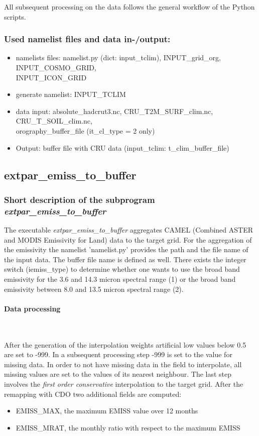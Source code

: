 \documentclass[a4paper,10pt,DIV14,BCOR1cm,titlepage,twoside]{scrartcl}
\begin{document}
\noindent All subsequent processing on the data follows the general workflow of the Python scripts.

\subsubsection{Used namelist files and data in-/output:}
\begin{itemize}
 \item namelists files: namelist.py (dict: input\_tclim), INPUT\_grid\_org, INPUT\_COSMO\_GRID, \\
       INPUT\_ICON\_GRID
 \item generate namelist: INPUT\_TCLIM
 \item data input: absolute\_hadcrut3.nc, CRU\_T2M\_SURF\_clim.nc, CRU\_T\_SOIL\_clim.nc, \\
       orography\_buffer\_file (it\_cl\_type = 2 only)
 \item Output: buffer file with CRU data (input\_tclim: t\_clim\_buffer\_file)
\end{itemize}

\subsection{extpar\_emiss\_to\_buffer}\label{extpar_emiss_to_buffer}
\subsubsection{Short description of the subprogram \textit{extpar\_emiss\_to\_buffer}}
The executable \textit{extpar\_emiss\_to\_buffer} aggregates CAMEL (Combined ASTER and MODIS Emissivity for Land) data  to the target grid.
For the aggregation of the emissivity the namelist 'namelist.py' provides the path and the file name of the input data. The buffer file name is defined as well. There exists the integer switch (iemiss\_type)
to determine whether one wants to use the broad band emissivity for the 3.6 and 14.3 micron spectral range
(1) or the broad band emissivity between 8.0 and 13.5 micron spectral range (2).

\paragraph{Data processing} \ \par\medskip\noindent
After the generation of the interpolation weights artificial low values below 0.5 are set to -999. In a subsequent processing step -999 is set to the value for missing data.
In order to not have missing data in the field to interpolate, all missing values are set to the values of its nearest neighbour.
The last step involves the \textit{first order conservative} interpolation to the target grid. After the remapping with CDO two additional fields are computed:
\begin{itemize}
  \item EMISS\_MAX, the maximum EMISS value over 12 months
  \item EMISS\_MRAT, the monthly ratio with respect to the maximum EMISS
\end{itemize}
\end{document}
